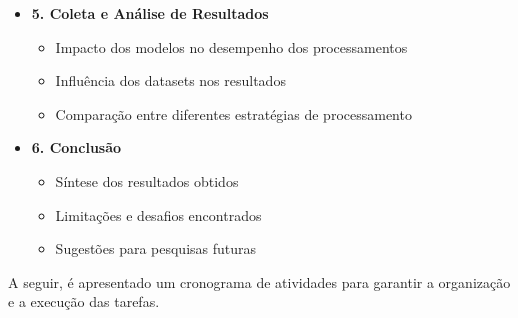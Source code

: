 \begin{itemize}
    \item \textbf{5. Coleta e Análise de Resultados}
    \begin{itemize}
        \item Impacto dos modelos no desempenho dos processamentos
        \item Influência dos datasets nos resultados
        \item Comparação entre diferentes estratégias de processamento
    \end{itemize}

    \item \textbf{6. Conclusão}
    \begin{itemize}
        \item Síntese dos resultados obtidos
        \item Limitações e desafios encontrados
        \item Sugestões para pesquisas futuras
    \end{itemize}
\end{itemize}

A seguir, é apresentado um cronograma de atividades para garantir a organização e a execução das tarefas.

\renewcommand{\arraystretch}{1.5}
\begin{table}[h!]
    \centering
    \caption{Cronograma de Atividades}
    \label{tab:cronograma}
\end{table}

